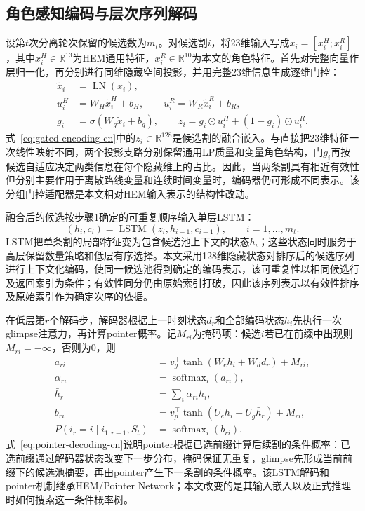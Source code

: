 \documentclass[final,5p,times,twocolumn]{elsarticle}
\begin{document}
\subsection{角色感知编码与层次序列解码}

设第$t$次分离轮次保留的候选数为$m_t$。对候选割$i$，将23维输入写成$x_i=[x_i^{H};x_i^{R}]$，其中$x_i^{H}\in\mathbb R^{13}$为HEM通用特征，$x_i^{R}\in\mathbb R^{10}$为本文的角色特征。首先对完整向量作层归一化，再分别进行同维隐藏空间投影，并用完整23维信息生成逐维门控：
\begin{equation}
\begin{aligned}
\widetilde x_i&=\operatorname{LN}(x_i),\\
u_i^{H}&=W_H\widetilde x_i^{H}+b_H,\qquad
u_i^{R}=W_R\widetilde x_i^{R}+b_R,\\
g_i&=\sigma(W_g\widetilde x_i+b_g),\qquad
z_i=g_i\odot u_i^{H}+(1-g_i)\odot u_i^{R}.
\end{aligned}
\label{eq:gated-encoding-cn}
\end{equation}
式~\eqref{eq:gated-encoding-cn}中的$z_i\in\mathbb R^{128}$是候选割的融合嵌入。与直接把23维特征一次线性映射不同，两个投影支路分别保留通用LP质量和变量角色结构，门$g_i$再按候选自适应决定两类信息在每个隐藏维上的占比。因此，当两条割具有相近有效性但分别主要作用于离散路线变量和连续时间变量时，编码器仍可形成不同表示。该分组门控适配器是本文相对HEM输入表示的结构性改动。

融合后的候选按步骤1确定的可重复顺序输入单层LSTM：
\begin{equation}
(h_i,c_i)=\operatorname{LSTM}(z_i,h_{i-1},c_{i-1}),\qquad i=1,\ldots,m_t .
\label{eq:lstm-encoding-cn}
\end{equation}
LSTM把单条割的局部特征变为包含候选池上下文的状态$h_i$；这些状态同时服务于高层保留数量策略和低层有序选择。本文采用128维隐藏状态对排序后的候选序列进行上下文化编码，使同一候选池得到确定的编码表示，该可重复性以相同候选行及返回索引为条件；有效性同分仍由原始索引打破，因此该序列表示以有效性排序及原始索引作为确定次序的依据。

在低层第$r$个解码步，解码器根据上一时刻状态$d_r$和全部编码状态$h_i$先执行一次glimpse注意力，再计算pointer概率。记$M_{ri}$为掩码项：候选$i$若已在前缀中出现则$M_{ri}=-\infty$，否则为0，则
\begin{equation}
\begin{aligned}
a_{ri}&=v_g^\top\tanh(W_e h_i+W_d d_r)+M_{ri},\\
\alpha_{ri}&=\operatorname{softmax}_i(a_{ri}),\\
\bar h_r&=\sum_i\alpha_{ri}h_i,\\
b_{ri}&=v_p^\top\tanh(U_e h_i+U_g\bar h_r)+M_{ri},\\
P(i_r=i\mid i_{1:r-1},S_t)&=\operatorname{softmax}_i(b_{ri}).
\end{aligned}
\label{eq:pointer-decoding-cn}
\end{equation}
式~\eqref{eq:pointer-decoding-cn}说明pointer根据已选前缀计算后续割的条件概率：已选前缀通过解码器状态改变下一步分布，掩码保证无重复，glimpse先形成当前前缀下的候选池摘要，再由pointer产生下一条割的条件概率。该LSTM解码和pointer机制继承HEM/Pointer Network；本文改变的是其输入嵌入以及正式推理时如何搜索这一条件概率树。
\end{document}
